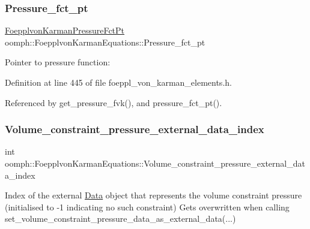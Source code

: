 \subsubsection{\texorpdfstring{Pressure\+\_\+fct\+\_\+pt}{Pressure\_fct\_pt}}
{\footnotesize\ttfamily \hyperlink{classoomph_1_1FoepplvonKarmanEquations_a39b64f9712ec34f455beb9f4271ff297}{Foepplvon\+Karman\+Pressure\+Fct\+Pt} oomph\+::\+Foepplvon\+Karman\+Equations\+::\+Pressure\+\_\+fct\+\_\+pt\hspace{0.3cm}{\ttfamily [protected]}}



Pointer to pressure function\+: 



Definition at line 445 of file foeppl\+\_\+von\+\_\+karman\+\_\+elements.\+h.



Referenced by get\+\_\+pressure\+\_\+fvk(), and pressure\+\_\+fct\+\_\+pt().

\mbox{\label{classoomph_1_1FoepplvonKarmanEquations_a649df9e5e9f5717be0c34c017875e352}} 
\subsubsection{\texorpdfstring{Volume\+\_\+constraint\+\_\+pressure\+\_\+external\+\_\+data\+\_\+index}{Volume\_constraint\_pressure\_external\_data\_index}}
{\footnotesize\ttfamily int oomph\+::\+Foepplvon\+Karman\+Equations\+::\+Volume\+\_\+constraint\+\_\+pressure\+\_\+external\+\_\+data\+\_\+index\hspace{0.3cm}{\ttfamily [private]}}



Index of the external \hyperlink{classoomph_1_1Data}{Data} object that represents the volume constraint pressure (initialised to -\/1 indicating no such constraint) Gets overwritten when calling set\+\_\+volume\+\_\+constraint\+\_\+pressure\+\_\+data\+\_\+as\+\_\+external\+\_\+data(...) 



